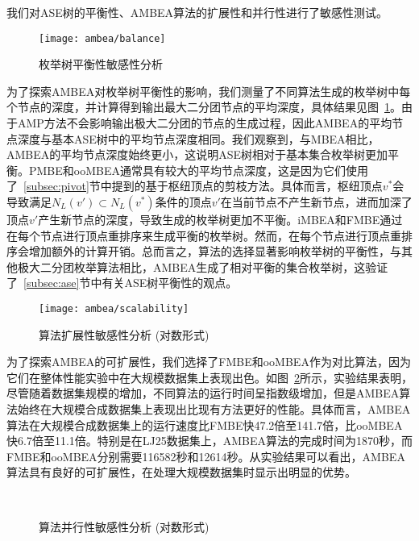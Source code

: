 我们对ASE树的平衡性、AMBEA算法的扩展性和并行性进行了敏感性测试。

\begin{figure} [H]
	\centering
	\texttt{[image: ambea/balance]}
	\caption{枚举树平衡性敏感性分析}
	\label{fig:ambea_exp_balance}
\end{figure}

为了探索AMBEA对枚举树平衡性的影响，我们测量了不同算法生成的枚举树中每个节点的深度，并计算得到输出最大二分团节点的平均深度，具体结果见图~\ref{fig:ambea_exp_balance}。由于AMP方法不会影响输出极大二分团的节点的生成过程，因此AMBEA的平均节点深度与基本ASE树中的平均节点深度相同。我们观察到，与MBEA相比，AMBEA的平均节点深度始终更小，这说明ASE树相对于基本集合枚举树更加平衡。PMBE和ooMBEA通常具有较大的平均节点深度，这是因为它们使用了~\ref{subsec:pivot}节中提到的基于枢纽顶点的剪枝方法。具体而言，枢纽顶点$v^*$会导致满足$N_L(v')\subset N_L(v^*)$条件的顶点$v'$在当前节点不产生新节点，进而加深了顶点$v'$产生新节点的深度，导致生成的枚举树更加不平衡。iMBEA和FMBE通过在每个节点进行顶点重排序来生成平衡的枚举树。然而，在每个节点进行顶点重排序会增加额外的计算开销。总而言之，算法的选择显著影响枚举树的平衡性，与其他极大二分团枚举算法相比，AMBEA生成了相对平衡的集合枚举树，这验证了~\ref{subsec:ase}节中有关ASE树平衡性的观点。

\begin{figure} [H]
	\centering
	\texttt{[image: ambea/scalability]}
	\caption{算法扩展性敏感性分析 (对数形式)}
	\label{fig:ambea_exp_scalability}
\end{figure}

为了探索AMBEA的可扩展性，我们选择了FMBE和ooMBEA作为对比算法，因为它们在整体性能实验中在大规模数据集上表现出色。如图~\ref{fig:ambea_exp_scalability}所示，实验结果表明，尽管随着数据集规模的增加，不同算法的运行时间呈指数级增加，但是AMBEA算法始终在大规模合成数据集上表现出比现有方法更好的性能。具体而言，AMBEA算法在大规模合成数据集上的运行速度比FMBE快47.2倍至141.7倍，比ooMBEA快6.7倍至11.1倍。特别是在LJ25数据集上，AMBEA算法的完成时间为1870秒，而FMBE和ooMBEA分别需要116582秒和12614秒。从实验结果可以看出，AMBEA算法具有良好的可扩展性，在处理大规模数据集时显示出明显的优势。


\begin{figure} [H]
	\centering
  \quad
  \\
  \quad
  

	\caption{算法并行性敏感性分析 (对数形式)}
	\label{fig:ambea_paral}
\end{figure}

